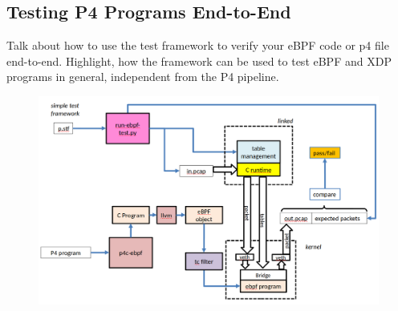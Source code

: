 \subsection{Testing P4 Programs End-to-End}
Talk about how to use the test framework to verify your eBPF code or p4 file 
end-to-end. Highlight, how the framework can be used to test eBPF and XDP 
programs in general, independent from the P4 pipeline.
\begin{figure}
	\centering
	\includegraphics[width=0.7\linewidth]{kernel_test}
	\caption{}
	\label{fig:kernel_test}
\end{figure}